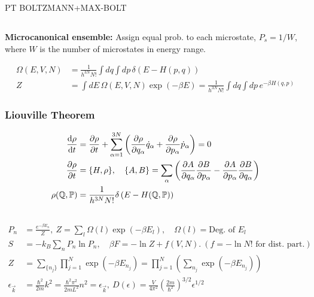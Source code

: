 \documentclass[a4paper, english, 12pt]{article}
\newcommand{\closed}[1]{\left( #1 \right)}
\newcommand{\curly}[1]{\{ #1 \} }
\newcommand{\Q}{\mathbb{Q}}
\renewcommand{\P}{\mathbb{P}}
\begin{document}
\begin{multicols*}{2}
PT 
BOLTZMANN+MAX-BOLT 

\subsection*{}

\textbf{Microcanonical ensemble:} Assign equal prob. to each microstate, $P_s=1/W$, where $W$ is the number of microstates in energy range.   

\begin{align*}
    \Omega(E,V,N) &=\frac{1}{h^{3N}N!}\int dq \int dp\, \delta(E-H(p,q)) \\
    Z &= \int dE\, \Omega(E,V,N) \exp(-\beta E) = \frac{1}{h^{3N}N!}\int dq \int dp\, e^{-\beta H(q,p)} 
\end{align*}


\subsubsection*{\scriptsize Liouville Theorem}

\begin{align*}
    \dv{\rho}{t} &= \pdv{\rho}{t} + \sum_{\alpha=1}^{3N} \closed{\pdv{\rho}{q_\alpha} \dot{q}_\alpha + \pdv{\rho}{p_\alpha}\dot{p}_\alpha } = 0 \\
    \pdv{\rho}{t} &= \curly{H,\rho},\quad \curly{A,B}=\sum_\alpha \closed{\pdv{A}{q_\alpha}\pdv{B}{p_\alpha} - \pdv{A}{p_\alpha}\pdv{B}{q_\alpha}} \\ 
    \rho(\Q,\P) &= \frac{1}{h^{3N} N!} \delta\closed{E-H(\Q,\P)}
\end{align*}


\subsection*{}

\begin{align*}
    P_n &= \frac{e^{-\beta E_n}}{Z},\: Z = \sum_l \Omega(l)\exp(-\beta E_l),\quad \Omega(l)=\text{Deg. of }E_l \\
    S &= -k_B \sum_n P_n \ln P_n,\quad \beta F = -\ln Z + f(V,N).\:(f=-\ln N!\text{ for dist. part.}) \\
    Z &= \sum_{\curly{n_j}} \prod_{j=1}^N \exp(-\beta E_{n_j}) = \prod_{j=1}^N \left( \sum_{n_j} \exp(-\beta E_{n_j}) \right) \\
    \epsilon_{\vec{k}} &= \frac{\hbar^2 }{2m}k^2 = \frac{\hbar^2 \pi^2}{2mL^2}n^2 = \epsilon_{\vec{k}},\:D(\epsilon) = \frac{V}{4\pi^2} \left(\frac{2m}{\hbar^2}\right)^{3/2} \epsilon^{1/2}
\end{align*}




\end{multicols*}
\end{document}
